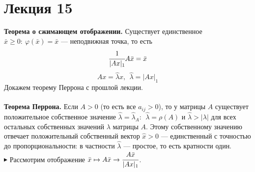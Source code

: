 \documentclass[12pt]{article}
\theoremstyle{definition}
\numberwithin{equation}{section}
\begin{document}
	\section *{Лекция 15}
	\noindent\textbf{Теорема о сжимающем отображении.} Существует единственное $\bar x\geqslant 0:~\varphi(\bar x)=\bar x$ --- неподвижная точка, то есть $$\cfrac{1}{|Ax|_1}A\bar x=\bar x$$
	$$Ax=\hat \lambda x,~~\hat \lambda=|Ax|_1$$
	Докажем теорему Перрона с прошлой лекции.\\ \\
	\textbf{Теорема Перрона.} Если $A>0$ (то есть все $a_{ij}>0$), то у матрицы $A$ существует положительное собственное значение $\hat \lambda =\hat \lambda_A:~~\hat \lambda =\rho(A)$ и $\hat \lambda>|\lambda|$ для всех остальных собственных значений $\lambda$ матрицы $A$. Этому собственному значению отвечает положительный собственный вектор $\hat x>0$ --- единственный с точностью до пропорциональности: в частности $\hat \lambda$ --- простое, то есть кратности один.\\
	$\blacktriangleright$ Рассмотрим отображение $\bar x \mapsto A \bar x \to \cfrac{A\bar x}{|Ax|_1}$.\\
\end{document}
